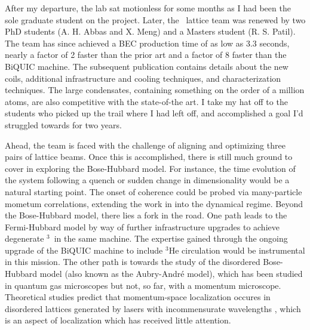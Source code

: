 	After my departure, the lab sat motionless for some months as I had been the sole graduate student on the project.
	Later, the \mhe~lattice team was renewed by two PhD students (A. H.	Abbas and X. Meng) and a Masters student (R. S. Patil).
	The team has since achieved a BEC production time of as low as 3.3 seconds, nearly a factor of 2 faster than the prior art \cite{Bouton15} and a factor of 8 faster than the BiQUIC machine.
	The subsequent publication \cite{Abbas21} contains details about the new coils, additional infrastructure and cooling techniques, and characterization techniques.
	The large condensates, containing something on the order of a million atoms, are also competitive with the state-of-the art.
	I take my hat off to the students who picked up the trail where I had left off, and accomplished a goal I'd struggled towards for two years.


	Ahead, the team is faced with the challenge of aligning and optimizing three pairs of lattice beams.
	Once this is accomplished, there is still much ground to cover in exploring the Bose-Hubbard model.
	For instance, the time evolution of the system following a quench or sudden change in dimensionality would be a natural starting point.
	The onset of coherence could be probed via many-particle mometum correlations, extending the work in \cite{Carcy19} into the dynamical regime.	
	Beyond the Bose-Hubbard model, there lies a fork in the road.
	One path leads to the Fermi-Hubbard model by way of further infrastructure upgrades to achieve degenerate $^3$\mhe~in the same machine.
	The expertise gained through the ongoing upgrade of the BiQUIC machine to include $^3$He circulation would be instrumental in this mission.
	The other path is towards the study of the disordered Bose-Hubbard model (also known as the Aubry-Andr\'{e} model), which has been studied in quantum gas microscopes \cite{Rispoli19} but not, so far, with a momentum microscope.
	Theoretical studies predict that momentum-space localization occures in disordered lattices generated by lasers with incommensurate wavelengths \cite{Larcher11}, which is an aspect of localization which has received little attention.
	\vfill



